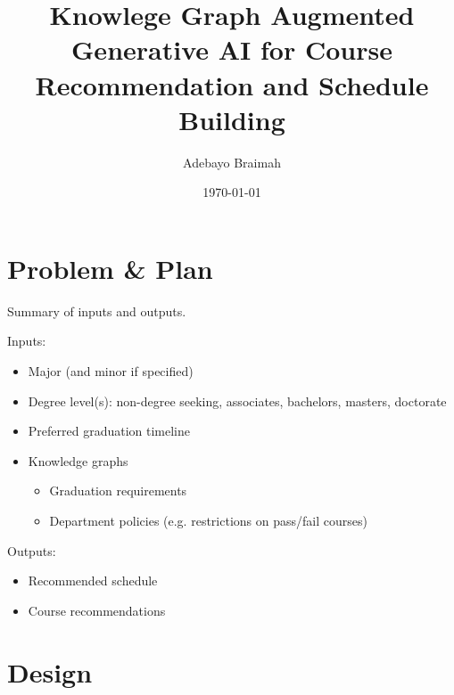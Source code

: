 \documentclass[12pt]{article}
\title{Knowlege Graph Augmented Generative AI for Course Recommendation and Schedule Building}
\author{Adebayo Braimah}
\date{\today}
\begin{document}
    \maketitle
    
    \section{Problem \& Plan}
    \label{sec:prob_plan}

    Summary of inputs and outputs.

    Inputs:

    \begin{itemize}
        \item Major (and minor if specified)
        \item Degree level(s): non-degree seeking, associates, bachelors, masters, doctorate
        \item Preferred graduation timeline
        \item Knowledge graphs
        \begin{itemize}
            \item Graduation requirements
            \item Department policies (e.g. restrictions on pass/fail courses)
        \end{itemize}
    \end{itemize}

    Outputs:

    \begin{itemize}
        \item Recommended schedule
        \item Course recommendations
    \end{itemize}
    
    \section{Design}
    \label{sec:design}
    
\end{document}
